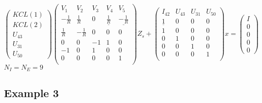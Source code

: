 \documentclass[10pt]{article}
\begin{document}
\[\left(\begin{array}{c}
KCL(1)\\KCL(2)\\U_{43}\\U_{31}\\U_{50}
\end{array}\right)
\left(\begin{array}{ccccc}
V_{1}&V_{2}&V_{3}&V_{4}&V_{5}\\
  \hline
  -\frac{1}{R}&\frac{1}{R}&0&\underline{\frac{1}{R}}&\underline{-\frac{1}{R}}\\
  \frac{1}{R}&-\frac{1}{R}&0&0&0\\
  0&0&-1&1&0\\
  -1&0&1&0&0\\
  0&0&0&0&1\\
\end{array}\right)Z_{s}+
\left(\begin{array}{cccc}
  I_{42}&U_{43}&U_{31}&U_{50}\\
  \hline
  \underline{1}&0&0&0\\
  1&0&0&0\\0&1&0&0\\0&0&1&0\\0&0&0&1\\
\end{array}\right)x=
\left(\begin{array}{c}
  I\\0\\0\\0\\0
  \end{array}\right)
\]
$N_{I}=N_{E}=9$
\subsection{Example 3}
\begin{figure}[h]
\centerline{
 \scalebox{0.8}{
    
 }
}
\end{figure}
\end{document}
